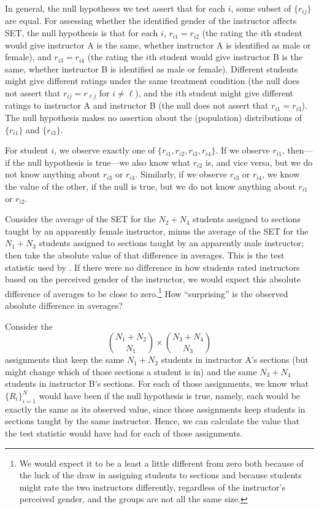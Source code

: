 \documentclass[12pt]{article}
\newcommand{\beq}{\begin{equation}}
\newcommand{\eeq}{\end{equation}}
\begin{document}
In general, the null hypotheses we test assert that for each $i$, some subset of
$\{r_{ij}\}$ are  equal.
For assessing whether the identified gender of the instructor affects SET,
the null hypothesis is that for each $i$,
$r_{i1} = r_{i2}$ (the rating the $i$th student would give instructor A is the same,
whether instructor A is identified as male or female), 
and $r_{i3} = r_{i4}$ (the rating the $i$th student would give instructor B is
the same, whether instructor B is identified as male or female).
Different students might give different ratings
under the same treatment condition
(the null does not assert that $r_{ij} = r_{\ell j}$ for $i \ne \ell$), and
the $i$th student might 
give different ratings to instructor A and instructor B
(the null does not assert that $r_{i1} = r_{i3}$).
The null hypothesis makes no assertion about the (population) distributions of 
$\{r_{i1}\}$ and $\{r_{i3}\}$.

For student $i$, we observe exactly one of $\{r_{i1}, r_{i2}, r_{i3}, r_{i4}\}$.
If we observe $r_{i1}$, then---if the null hypothesis is true---we also know what $r_{i2}$ is,
and vice versa, but we do not know anything about $r_{i3}$ or $r_{i4}$.
Similarly, if we observe $r_{i3}$ or $r_{i4}$, we know the value of the other, if the
null is true, but we do not know anything about $r_{i1}$ or $r_{i2}$.

Consider the average of the SET for the $N_2 + N_4$ students
assigned to sections taught by an apparently female instructor, minus the 
average of the SET for the $N_1 + N_3$ students
assigned to sections taught by an apparently male instructor; then
take the absolute value of that difference in averages.
This is the test statistic used by \cite{MacNell2014}.
If there were no difference in how students rated instructors based on the perceived
gender of the instructor, we would expect this absolute difference of averages to be close to
zero.\footnote{%
We would expect it to be a least a little different from zero both because of the luck of the draw
in assigning students to sections and because students might rate the two instructors
differently, regardless of the instructor's perceived gender, and the groups are not all the same size.
}
How ``surprising'' is the observed absolute difference in averages?

Consider the
\beq
{{N_1 + N_2} \choose {N_1}} \times {{N_3+N_4} \choose {N_3}}
\eeq
assignments that keep the same $N_1 + N_2$ students in instructor A's
sections (but might change which of those sections a student is in) 
and the same $N_3 + N_4$ students in instructor B's sections.
For each of those assignments, we know what $\{R_i\}_{i=1}^N$ would
have been if the null hypothesis is true, namely, each would be exactly the same
as its observed value, since those
assignments keep students in sections taught by the same instructor.
Hence, we can calculate the value that the test statistic would have had for each
of those assignments.
\end{document}

